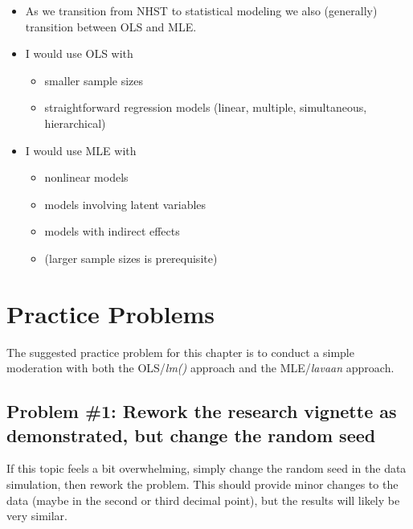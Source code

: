 \documentclass[
  11pt,
]{book}
\providecommand{\tightlist}{%
  \setlength{\itemsep}{0pt}\setlength{\parskip}{0pt}}
\begin{document}
\begin{itemize}
\tightlist
\item
  As we transition from NHST to statistical modeling we also (generally) transition between OLS and MLE.
\item
  I would use OLS with

  \begin{itemize}
  \tightlist
  \item
    smaller sample sizes
  \item
    straightforward regression models (linear, multiple, simultaneous, hierarchical)
  \end{itemize}
\item
  I would use MLE with

  \begin{itemize}
  \tightlist
  \item
    nonlinear models
  \item
    models involving latent variables
  \item
    models with indirect effects
  \item
    (larger sample sizes is prerequisite)
  \end{itemize}
\end{itemize}

\hypertarget{practice-problems-6}{%
\section{Practice Problems}\label{practice-problems-6}}

The suggested practice problem for this chapter is to conduct a simple moderation with both the OLS/\emph{lm()} approach and the MLE/\emph{lavaan} approach.

\hypertarget{problem-1-rework-the-research-vignette-as-demonstrated-but-change-the-random-seed-2}{%
\subsection{Problem \#1: Rework the research vignette as demonstrated, but change the random seed}\label{problem-1-rework-the-research-vignette-as-demonstrated-but-change-the-random-seed-2}}

If this topic feels a bit overwhelming, simply change the random seed in the data simulation, then rework the problem. This should provide minor changes to the data (maybe in the second or third decimal point), but the results will likely be very similar.
\end{document}
